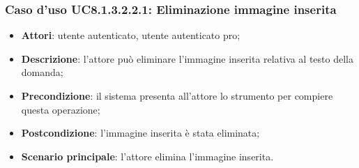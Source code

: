 \subsubsection{Caso d'uso UC8.1.3.2.2.1: Eliminazione immagine inserita}
		\begin{itemize}
		\item
			\textbf{Attori}: utente autenticato, utente autenticato pro;
		\item		
			\textbf{Descrizione}: l'attore può eliminare l'immagine inserita relativa al testo della domanda;
		\item
			\textbf{Precondizione}: il sistema presenta all'attore lo strumento per compiere questa operazione;
		\item
			\textbf{Postcondizione}: l'immagine inserita è stata eliminata;
		\item
			\textbf{Scenario principale}: l'attore elimina l'immagine inserita.				
		\end{itemize}
	
	
